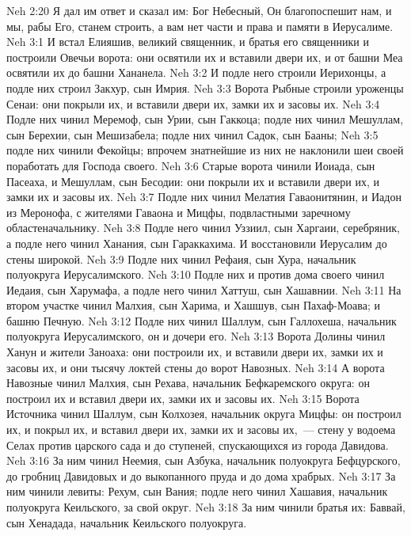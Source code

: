 \vs Neh 2:20 Я дал им ответ и сказал им: Бог Небесный, Он благопоспешит нам, и мы, рабы Его, станем строить, а вам нет части и права и памяти в Иерусалиме.
\vs Neh 3:1 И встал Елияшив, великий священник, и братья его священники и построили Овечьи ворота: они освятили их и вставили двери их, и от башни Меа освятили их до башни Хананела.
\vs Neh 3:2 И подле него строили Иерихонцы, а подле них строил Закхур, сын Имрия.
\vs Neh 3:3 Ворота Рыбные строили уроженцы Сенаи: они покрыли их, и вставили двери их, замки их и засовы их.
\vs Neh 3:4 Подле них чинил  Меремоф, сын Урии, сын Гаккоца; подле них чинил Мешуллам, сын Берехии, сын Мешизабела; подле них чинил Садок, сын Бааны;
\vs Neh 3:5 подле них чинили Фекойцы; впрочем знатнейшие из них не наклонили шеи своей поработать для Господа своего.
\vs Neh 3:6 Старые ворота чинили Иоиада, сын Пасеаха, и Мешуллам, сын Бесодии: они покрыли их и вставили двери их, и замки их и засовы их.
\vs Neh 3:7 Подле них чинил Мелатия Гаваонитянин, и Иадон из Меронофа, с жителями Гаваона и Мицфы, подвластными заречному областеначальнику.
\vs Neh 3:8 Подле него чинил Уззиил, сын Харгаии, серебряник, а подле него чинил Ханания, сын Гараккахима. И восстановили Иерусалим до стены широкой.
\vs Neh 3:9 Подле них чинил Рефаия, сын Хура, начальник полуокруга Иерусалимского.
\vs Neh 3:10 Подле них и против дома своего чинил Иедаия, сын Харумафа, а подле него чинил Хаттуш, сын Хашавнии.
\vs Neh 3:11 На втором участке чинил Малхия, сын Харима, и Хашшув, сын Пахаф-Моава;  и башню Печную.
\vs Neh 3:12 Подле них чинил Шаллум, сын Галлохеша, начальник полуокруга Иерусалимского, он и дочери его.
\vs Neh 3:13 Ворота Долины чинил Ханун и жители Заноаха: они построили их, и вставили двери их, замки их и засовы их, и  они тысячу локтей стены до ворот Навозных.
\vs Neh 3:14 А ворота Навозные чинил Малхия, сын Рехава, начальник Бефкаремского округа: он построил их и вставил двери их, замки их и засовы их.
\vs Neh 3:15 Ворота Источника чинил Шаллум, сын Колхозея, начальник округа Мицфы: он построил их, и покрыл их, и вставил двери их, замки их и засовы их,~---  стену у водоема Селах против царского сада и до ступеней, спускающихся из города Давидова.
\vs Neh 3:16 За ним чинил Неемия, сын Азбука, начальник полуокруга Бефцурского, до гробниц Давидовых и до выкопанного пруда и до дома храбрых.
\vs Neh 3:17 За ним чинили левиты: Рехум, сын Вания; подле него чинил Хашавия, начальник полуокруга Кеильского, за свой округ.
\vs Neh 3:18 За ним чинили братья их: Баввай, сын Хенадада, начальник Кеильского полуокруга.
